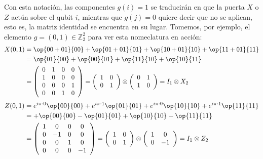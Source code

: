 \documentclass[11pt,a4paper,twoside,pdf]{article}
\numberwithin{equation}{section}
\begin{document}
		Con esta notación, las componentes $g(i)=1$ se traducirán en que la puerta $X$ o $Z$ actúa sobre el qubit $i$, mientras que $g(j)=0$ quiere decir que no se aplican, esto es, la matriz identidad se encuentra en su lugar. Tomemos, por ejemplo, el elemento $g=(0,1)\in \mathbb{Z}_2^2$ para ver esta nomeclatura en acción:
		\begin{equation*}
			\begin{aligned}
				X(0,1) &= \op{00+01}{00} + \op{01+01}{01} +\op{10+01}{10} + \op{11+01}{11} \\ 
				&= \op{01}{00} + \op{00}{01} + \op{11}{10} + \op{10}{11} \\
				&= \left(\begin{array}{cccc}
					0 & 1 & 0 & 0\\
					1 & 0 & 0 & 0\\
					0 & 0 & 0 & 1\\
					0 & 0 & 1 & 0
				\end{array}\right)	
				= \left(\begin{array}{cc} 1 & 0 \\ 0 & 1	\end{array}\right) \otimes
				\left(\begin{array}{cc} 0 & 1 \\ 1 & 0	\end{array}\right) = I_1 \otimes X_2 \\	
			\end{aligned}						
		\end{equation*}
		\begin{equation*}
			\begin{aligned}
				Z(0,1) &= e^{i\pi \cdot 0}\op{00}{00} + e^{i\pi \cdot 1} \op{01}{01} + e^{i\pi \cdot 0}\op{10}{10} +  e^{i\pi\cdot 1}\op{11}{11} \\ 
				&= +\op{00}{00} - \op{01}{01} + \op{10}{10} - \op{11}{11} \\
				&= \left(\begin{array}{cccc}
					1 & 0 & 0 & 0\\
					0 & -1 & 0 & 0\\
					0 & 0 & 1 & 0\\
					0 & 0 & 0 & -1
				\end{array}\right)	
				= \left(\begin{array}{cc} 1 & 0 \\ 0 & 1	\end{array}\right) \otimes
				\left(\begin{array}{cc} 1 & 0 \\ 0 & -1	\end{array}\right) = I_1 \otimes Z_2
			\end{aligned}			
		\end{equation*}
		
\end{document}
